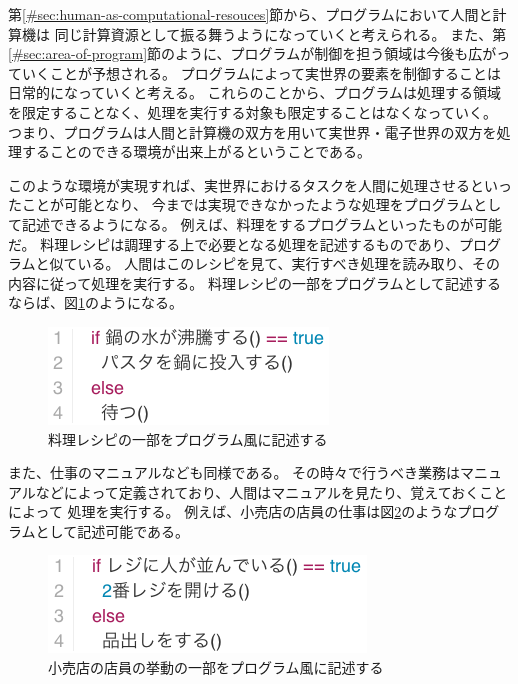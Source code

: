 第\ref{#sec:human-as-computational-resouces}節から、プログラムにおいて人間と計算機は
同じ計算資源として振る舞うようになっていくと考えられる。
また、第\ref{#sec:area-of-program}節のように、プログラムが制御を担う領域は今後も広がっていくことが予想される。
プログラムによって実世界の要素を制御することは日常的になっていくと考える。
これらのことから、プログラムは処理する領域を限定することなく、処理を実行する対象も限定することはなくなっていく。
つまり、プログラムは人間と計算機の双方を用いて実世界・電子世界の双方を処理することのできる環境が出来上がるということである。

このような環境が実現すれば、実世界におけるタスクを人間に処理させるといったことが可能となり、
今までは実現できなかったような処理をプログラムとして記述できるようになる。
例えば、料理をするプログラムといったものが可能だ。
料理レシピは調理する上で必要となる処理を記述するものであり、プログラムと似ている。
人間はこのレシピを見て、実行すべき処理を読み取り、その内容に従って処理を実行する。
料理レシピの一部をプログラムとして記述するならば、図\ref{fig:background_cooking}のようになる。

\begin{figure}[htbp]
  \begin{center}
  \includegraphics[width=.4\linewidth,bb=0 0 281 98]{images/background_cooking.js.png}
  \end{center}
  \caption{料理レシピの一部をプログラム風に記述する}
  \label{fig:background_cooking}
\end{figure}

また、仕事のマニュアルなども同様である。
その時々で行うべき業務はマニュアルなどによって定義されており、人間はマニュアルを見たり、覚えておくことによって
処理を実行する。
例えば、小売店の店員の仕事は図\ref{fig:background_retail}のようなプログラムとして記述可能である。

\begin{figure}[htbp]
  \begin{center}
  \includegraphics[width=.4\linewidth,bb=0 0 319 98]{images/background_retail.js.png}
  \end{center}
  \caption{小売店の店員の挙動の一部をプログラム風に記述する}
  \label{fig:background_retail}
\end{figure}

